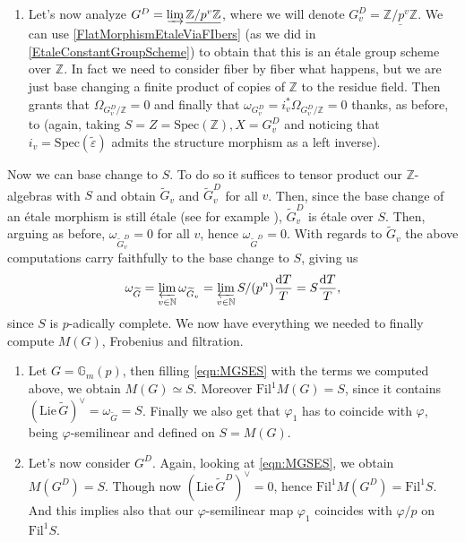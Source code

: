 \begin{ex}[]
\begin{enumerate}
	\item Let's now analyze $G^D = \varinjlim \underline{\mathbb{Z}/p^v\mathbb{Z}}$, where
		we will denote $G_v^D = \underline{\mathbb{Z}/p^v\mathbb{Z}}$.
		We can use \cref{FlatMorphismEtaleViaFIbers} (as we did in
		\cref{EtaleConstantGroupScheme}) to obtain that this is an étale
		group scheme over $\mathbb{Z}$.
		In fact we need to consider fiber by fiber what happens, but we are
		just base changing a finite product of copies of $\mathbb{Z}$ to the
		residue field.
		Then \cite[\href{https://stacks.math.columbia.edu/tag/00U0}{Section 00U0}]{SP}
		grants that $\Omega_{G_v^D/\mathbb{Z}} = 0$
		and finally that $\omega_{G_v^D} = i^*_v \Omega_{G^D_v/\mathbb{Z}} = 0$ thanks,
		as before, to
		\cite[\href{https://stacks.math.columbia.edu/tag/0474}{Lemma 0474}]{SP}
		(again, taking $S = Z = \mathrm{Spec}(\mathbb{Z}), X = G_v^D$
		and noticing that $i_v = \mathrm{Spec}(\widetilde{\varepsilon})$ admits the structure morphism
		as a left inverse).
\end{enumerate}
	Now we can base change to $S$.
	To do so it suffices to tensor product our $\mathbb{Z}$-algebras
	with $S$ and obtain $\widetilde{G}_v$ and $\widetilde{G}_v^D$ for all $v$.
	Then, since the base change of an étale morphism is still étale (see for example
	\cite[\href{https://stacks.math.columbia.edu/tag/02GO}{Lemma 02GO}]{SP}),
	$\widetilde{G}_v^D$ is étale over $S$.
	Then, arguing as before, $\omega_{\widetilde{G}_v^D} = 0$ for all $v$,
	hence $\omega_{\widetilde{G}^D} = 0$.
	With regards to $\widetilde{G}_v$ the above computations carry faithfully
	to the base change to $S$, giving us
	\begin{equation*}
	\omega_{\widetilde{G}} = \varprojlim_{v \in \mathbb{N}} \omega_{\widetilde{G}_v} =
	\varprojlim_{v \in \mathbb{N}} S/ (p^n) \frac{ \mathrm{d}T }{ T } = S \frac{ \mathrm{d}T }{ T }
	,\end{equation*}
	since $S$ is $p$-adically complete.
	We now have everything we needed to finally compute $M(G)$, Frobenius and filtration.
\begin{enumerate}
	\item Let $G = \mathbb{G}_m(p)$, then filling \cref{eqn:MGSES} with
		the terms we computed above, we obtain $M(G) \simeq S$.
		Moreover $\mathrm{Fil}^1 M(G) = S$, since it contains
		$(\mathrm{Lie}\, \widetilde{G})^\vee = \omega_{\widetilde{G}} = S$.
		Finally we also get that $\varphi_1$ has to coincide with $\varphi$,
		being $\varphi$-semilinear and defined on $S = M(G)$.

	\item Let's now consider $G^D$.
		Again, looking at \cref{eqn:MGSES}, we obtain $M(G^D) = S$.
		Though now $(\mathrm{Lie}\, \widetilde{G}^D)^\vee = 0$,
		hence $\mathrm{Fil}^1 M(G^D) = \mathrm{Fil}^1 S$.
		And this implies also that our $\varphi$-semilinear map
		$\varphi_1$ coincides with $\varphi/p$ on $\mathrm{Fil}^1S$.
\end{enumerate}
\end{ex}
